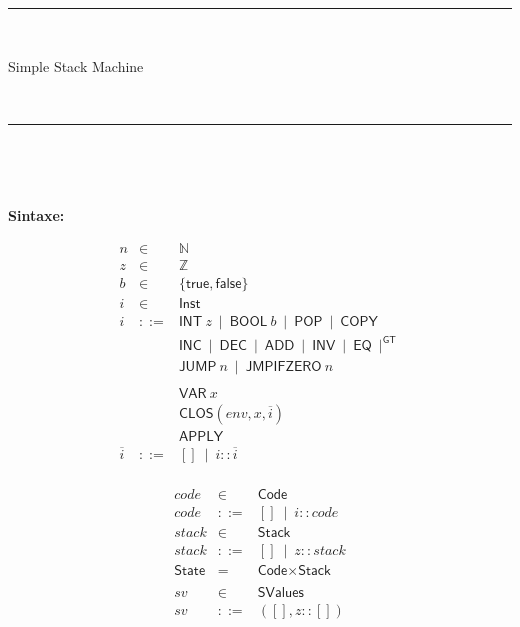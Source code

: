 \documentclass[10pt,a4paper]{article}
\begin{document}
\ 


\ 

\hrule 

\ 


\begin{center}
\Large Simple Stack Machine
\end{center}

\ 

\hrule 

\ 

\ 

\noindent \textbf{Sintaxe:}
\begin{multicols}{2}
\[ 
\begin{array}{lcl}
n  & \in & \mathbb{N}\\   
z  & \in & \mathbb{Z}\\ 
b  & \in & \{\textsf{true},\textsf{false}\} \\
i  & \in &  \textsf{Inst}\\  
i & ::= &  \textsf{INT}\ z ~\mid~ \textsf{BOOL}\ b ~\mid~  \textsf{POP} ~\mid~  \textsf{COPY}\\
&&  \textsf{INC} ~\mid~    \textsf{DEC} ~\mid~ \textsf{ADD} ~\mid~ \textsf{INV} ~\mid~ \textsf{EQ} ~\mid^ \textsf{GT} \\
&&  \textsf{JUMP}\ n ~\mid~  \textsf{JMPIFZERO}\ n\\ \\
&& \textsf{VAR}\ x \\
&& \textsf{CLOS}(env,x,\overline{i}) \\
&& \textsf{APPLY} \\
\overline{i} & ::= &  [] ~\mid~  i::\overline{i} \\    
\end{array}
\]

\[
\begin{array}{lcl}
 code  & \in &  \textsf{Code}\\ 
 code & ::=  & [] ~\mid~  i::  code\\    
 stack  & \in &  \textsf{Stack}\\
 stack & ::=  & [] ~\mid~ z::  stack \\ 
 \textsf{State} & = &  \textsf{Code}\times\textsf{Stack}\\ \\

 {sv} & \in &  \textsf{SValues}\\
 {sv} & ::= & ([],z::[]) \\
\end{array}
\]

\end{multicols}
\end{document}
